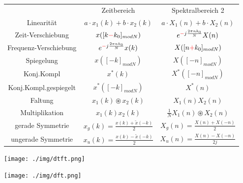 \documentclass[10pt,a4paper]{article}
\begin{document}
\normalsize
\scriptsize
\begin{center}
\begin{tabular}{ | c | c | c | }
\cline{1-3}
        & Zeitbereich & Spektralbereich 2\\
\cline{1-3}
        Linearität & $a\cdot x_1(k)+ b\cdot x_2(k)$ & $a\cdot X_1(n) +b\cdot X_2(n)$ \\
\cline{1-3}
        Zeit-Verschiebung & $x([k\textcolor{red}{-}k_0]_{modN})$ & $e^{\textcolor{red}{-}j\frac{2\pi nk_0}{N}} X(n)$\\
\cline{1-3}
        Frequenz-Verschiebung & $e^{\textcolor{red}{-}j\frac{2\pi nk_0}{N}} x(k)$ & $X([n\textcolor{red}{+}k_0]_{modN})$ \\  
\cline{1-3}
        Spiegelung & $x([-k]_{modN})$ & $X([-n]_{modN})$ \\  
\cline{1-3}
        Konj.Kompl & $x^*(k)$& $X^*([-n]_{modN})$\\ 
\cline{1-3}
        Konj.Kompl.gespiegelt & $x^*([-k]_{modN})$& $X^*(n)$\\ 
\cline{1-3}
        Faltung & $x_1(k) \circledast x_2(k)$ & $X_1(n)X_2(n)$ \\  
\cline{1-3}
        Multiplikation & $x_1(k)x_2(k)$ & $\frac{1}{N} X_1(n) \circledast X_2(n)$ \\
\cline{1-3}
        gerade Symmetrie & $x_g(k)=\frac{x(k)+\tilde{x}(-k)}{2}$ & $X_g(n)=\frac{X(n)+X(-n)}{2}$ \\
\cline{1-3}
        ungerade Symmetrie & $x_u(k)=\frac{x(k)-\tilde{x}(-k)}{2}$ & $X_u(n)=\frac{X(n)-X(-n)}{2j}$ \\
\cline{1-3}
\end{tabular}
\end{center}
\normalsize
  \begin{center}
      \texttt{[image: ./img/dtft.png]}
  \end{center}
  \begin{center}
      \texttt{[image: ./img/dft.png]}
  \end{center}
\end{document}
